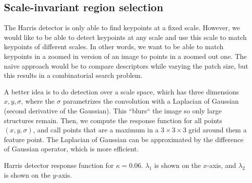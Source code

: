 \subsection{Scale-invariant region selection}

The Harris detector is only able to find keypoints at a fixed scale. However,
we would like to be able to detect keypoints at any scale and use this scale to
match keypoints of different scales. In other words, we want to be able to
match keypoints in a zoomed in version of an image to points in a zoomed out
one. The naive approach would be to compare descriptors while varying the patch
size, but this results in a combinatorial search problem.

A better idea is to do detection over a scale space, which has three dimensions
$x,y,\sigma$, where the $\sigma$ parametrizes the convolution with a Laplacian
of Gaussian (second derivative of the Gaussian). This ``blurs`` the image so only
large structures remain. Then, we compute the response function for all points
$(x,y,\sigma)$, and call points that are a maximum in a $3\times 3\times 3$
grid around them a feature point. The Laplacian of Gaussian can be approximated
by the difference of Gaussian operator, which is more efficient.

\begin{marginfigure}
    \centering
    \caption{Harris detector response function for $\kappa=0.06$. $\lambda_1$ is
        shown on the $x$-axis, and $\lambda_2$ is shown on the $y$-axis.}
    \label{fig:response}
\end{marginfigure}

